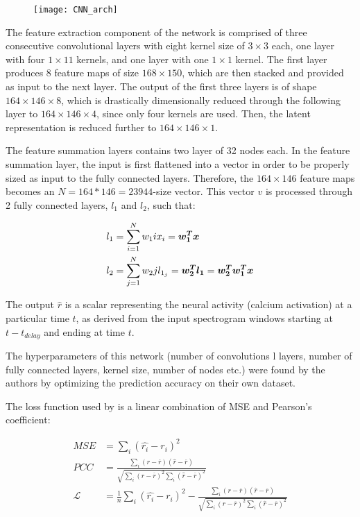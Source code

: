\begin{figure}[ht]
	\centering
	\texttt{[image: CNN\_arch]}
	\caption{\parencite{keshishianEstimatingInterpretingNonlinear2020}}
\end{figure}

The feature extraction component of the network is comprised of three consecutive convolutional layers with eight kernel size of $3 \times 3$ each, one layer with four $1 \times 1 1$ kernels, and one layer with one $1 \times 1$ kernel. The first layer produces 8 feature maps of size $168 \times 150$, which are then stacked and provided as input to the next layer. The output of the first three layers is of shape $164 \times 146 \times 8$, which is drastically dimensionally reduced through the following layer to $164 \times 146 \times 4$, since only four kernels are used. Then, the latent representation is reduced further to $164 \times 146 \times 1$.

The feature summation layers contains two layer of 32 nodes each. In the feature summation layer, the input is first flattened into a vector in order to be properly sized as input to the fully connected layers. Therefore, the $164 \times 146$ feature maps becomes an $N = 164 * 146 = 23944$-size vector. This vector $v$ is processed through 2 fully connected layers, $l_1$ and $l_2$, such that:

\begin{align}
	l_1 &= \sum_{i=1}^N w_1i x_i = \bm{w_1^T}\bm{x} \\
	l_2 &= \sum_{j=1}^N w_2j l_{1_j} = \bm{w_2^T}\bm{l_1} = \bm{w_2^T}\bm{w_1^T}\bm{x}
\end{align}

The output $\hat{r}$ is a scalar representing the neural activity (calcium activation) at a particular time $t$, as derived from the input spectrogram windows starting at $t - t_{delay}$ and ending at time $t$.

The hyperparameters of this network (number of convolutions l layers, number of fully connected layers, kernel size, number of nodes etc.) were found by the authors by optimizing the prediction accuracy on their own dataset.

The loss function used by \parencite{keshishianEstimatingInterpretingNonlinear2020} is a linear combination of MSE and Pearson's coefficient:

\begin{align}
	MSE &= \sum_i (\hat{r_i} -r_i)^2 \\
	PCC &= \frac{\sum _i (r - \overline{r}) (\hat{r} - \overline{r})}{\sqrt{\sum _i (r - \overline{r})^2 \sum _i (\hat{r} - \overline{r})^2}} \\
	\mathcal{L} &= \frac{1}{n} \sum_i (\hat{r_i} -r_i)^2 - \frac{\sum _i (r - \overline{r}) (\hat{r} - \overline{r})}{\sqrt{\sum _i (r - \overline{r})^2 \sum _i (\hat{r} - \overline{r})^2}}
\end{align}

